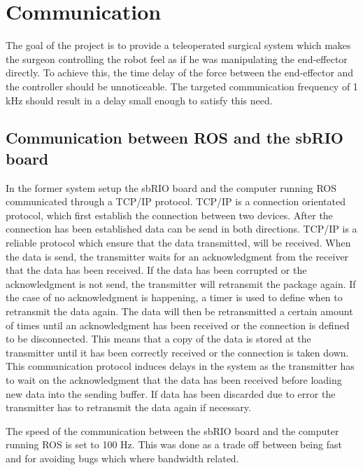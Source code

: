 \chapter{Communication}\label{cha:communication}

The goal of the project is to provide a teleoperated surgical system which makes the surgeon controlling the robot feel as if he was manipulating the end-effector directly. To achieve this, the time delay of the force between the end-effector and the controller should be unnoticeable. The targeted communication frequency of 1 kHz should result in a delay small enough to satisfy this need.

\section{Communication between ROS and the sbRIO board}

In the former system setup the sbRIO board and the computer running ROS communicated through a TCP/IP protocol. TCP/IP is a connection orientated protocol, which first establish the connection between two devices. After the connection has been established data can be send in both directions. TCP/IP is a reliable protocol which ensure that the data transmitted, will be received. When the data is send, the transmitter waits for an acknowledgment from the receiver that the data has been received. If the data has been corrupted or the acknowledgment is not send, the transmitter will retransmit the package again. If the case of no acknowledgment is happening, a timer is used to define when to retransmit the data again. The data will then be retransmitted a certain amount of times until an acknowledgment has been received or the connection is defined to be disconnected. This means that a copy of the data is stored at the transmitter until it has been correctly received or the connection is taken down.\\ 
This communication protocol induces delays in the system as the transmitter has to wait on the acknowledgment that the data has been received before loading new data into the sending buffer. If data has been discarded due to error the transmitter has to retransmit the data again if necessary.  

The speed of the communication between the sbRIO board and the computer running ROS is set to 100 Hz. This was done as a trade off between being fast and for avoiding bugs which where bandwidth related\cite{Chris_Surgical}.


